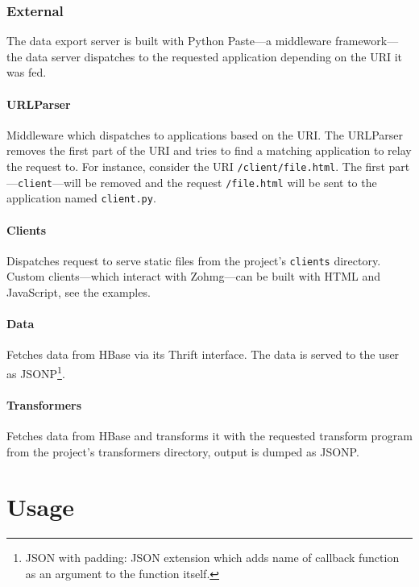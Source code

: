 \documentclass[a4paper,10pt]{book}
\begin{document}
\subsection{External}

The data export server is built with Python Paste---a middleware
framework---the data server dispatches to the requested application
depending on the URI it was fed.


\subsubsection{URLParser}

Middleware which dispatches to applications based on the URI. The URLParser
removes the first part of the URI and tries to find a matching application
to relay the request to. For instance, consider the URI
\texttt{/client/file.html}. The first part---\texttt{client}---will be
removed and the request \texttt{/file.html} will be sent to the application
named \texttt{client.py}.


\subsubsection{Clients}

Dispatches request to serve static files from the project's
\texttt{clients} directory. Custom clients---which interact with Zohmg---can
be built with HTML and JavaScript, see the examples.


\subsubsection{Data}

Fetches data from HBase via its Thrift interface. The data is served to the
user as JSONP\footnote{JSON with padding: JSON extension which adds name of
callback function as an argument to the function itself.}.


\subsubsection{Transformers}

Fetches data from HBase and transforms it with the requested transform
program from the project's transformers directory, output is
dumped as JSONP.





\chapter{Usage}
\end{document}
